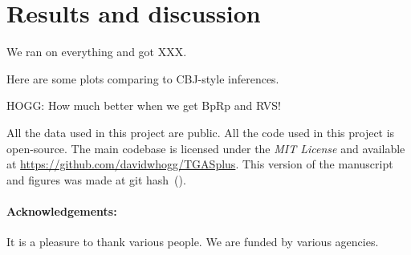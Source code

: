 \documentclass[12pt]{article}
\newcommand{\project}[1]{\textsl{#1}}
\newcommand{\acronym}[1]{\small{#1}}
\begin{document}
\section{Results and discussion}
We ran on everything and got XXX.

Here are some plots comparing to CBJ-style inferences.

HOGG: How much better when we get BpRp and RVS!

All the data used in this project are public. All the code used in
this project is open-source. The main codebase is licensed under the
\project{\acronym{MIT} License} and available at
\url{https://github.com/davidwhogg/TGASplus}. This version of the
manuscript and figures was made at git hash
\textsf{\githash\,(\gitdate)}.

\paragraph{Acknowledgements:}
It is a pleasure to thank various people.
We are funded by various agencies.
\end{document}
